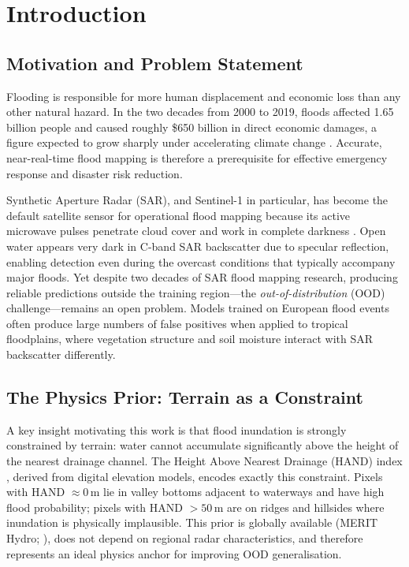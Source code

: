 \documentclass[12pt]{article}
\begin{document}
\section{Introduction}
\label{sec:intro}

\subsection{Motivation and Problem Statement}

Flooding is responsible for more human displacement and economic loss than any
other natural hazard.  In the two decades from 2000 to 2019, floods affected
1.65 billion people and caused roughly \$650 billion in direct economic
damages, a figure expected to grow sharply under accelerating climate change
\cite{undrr2020}.  Accurate, near-real-time flood mapping is therefore a
prerequisite for effective emergency response and disaster risk reduction.

Synthetic Aperture Radar (SAR), and Sentinel-1 in particular, has become the
default satellite sensor for operational flood mapping because its
active microwave pulses penetrate cloud cover and work in complete darkness
\cite{torres2012gmes}.  Open water appears very dark in C-band SAR backscatter
due to specular reflection, enabling detection even during the overcast
conditions that typically accompany major floods.  Yet despite two decades of
SAR flood mapping research, producing reliable predictions outside the training
region—the \emph{out-of-distribution} (OOD) challenge—remains an open
problem.  Models trained on European flood events often produce large numbers
of false positives when applied to tropical floodplains, where vegetation
structure and soil moisture interact with SAR backscatter differently.

\subsection{The Physics Prior: Terrain as a Constraint}

A key insight motivating this work is that flood inundation is strongly
constrained by terrain: water cannot accumulate significantly above the
height of the nearest drainage channel.  The Height Above Nearest Drainage
(HAND) index \cite{renno2008hand}, derived from digital elevation models, encodes
exactly this constraint.  Pixels with HAND $\approx 0$\,m lie in valley
bottoms adjacent to waterways and have high flood probability; pixels with
HAND $> 50$\,m are on ridges and hillsides where inundation is physically
implausible.  This prior is globally available (MERIT Hydro; \citealt{yamazaki2019merit}),
does not depend on regional radar characteristics, and therefore represents
an ideal physics anchor for improving OOD generalisation.
\end{document}
